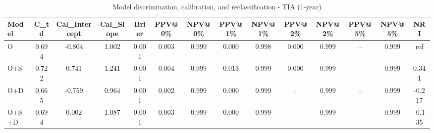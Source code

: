\begin{table}[htbp]
\centering
\small
\caption{Model discrimination, calibration, and reclassification - TIA (1-year)}
\label{tab:perf_tia_1y}
\begin{tabular}{lccccccccccccc}
\toprule
Model & C\_td & Cal\_Intercept & Cal\_Slope & Brier & PPV@0\% & NPV@0\% & PPV@1\% & NPV@1\% & PPV@2\% & NPV@2\% & PPV@5\% & NPV@5\% & NRI \\
\midrule
O & 0.694 & -0.804 & 1.002 & 0.001 & 0.003 & 0.999 & 0.000 & 0.998 & 0.000 & 0.999 & -- & 0.999 & ref \\
O+S & 0.722 & 0.741 & 1.241 & 0.001 & 0.004 & 0.999 & 0.013 & 0.999 & 0.000 & 0.999 & -- & 0.999 & 0.341 \\
O+D & 0.665 & -0.759 & 0.964 & 0.001 & 0.002 & 0.999 & 0.000 & 0.999 & -- & 0.999 & -- & 0.999 & -0.217 \\
O+S+D & 0.694 & 0.002 & 1.087 & 0.001 & 0.003 & 0.999 & 0.000 & 0.999 & -- & 0.999 & -- & 0.999 & -0.135 \\
\bottomrule
\end{tabular}
\end{table}